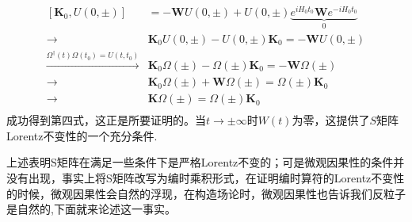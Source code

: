 \begin{equation}
    \begin{aligned}
        [\boldsymbol{K}_0,U(0,\pm)]&=-\boldsymbol{W}U(0,\pm)+U(0,\pm)\underbrace{e^{iH_0t_0}\boldsymbol{W}e^{-iH_0t_0}}_{0}\\
        \longrightarrow&\boldsymbol{K}_0U(0,\pm)-U(0,\pm)\boldsymbol{K}_0=-\boldsymbol{W}U(0,\pm)\\
        \overset{\Omega^\dagger(t)\Omega(t_0)=U(t,t_0)}{\longrightarrow}&\boldsymbol{K}_0\Omega(\pm)-\Omega(\pm)\boldsymbol{K}_0=-\boldsymbol{W}\Omega(\pm)\\
        \longrightarrow&\boldsymbol{K}_0\Omega(\pm)+\boldsymbol{W}\Omega(\pm)=\Omega(\pm)\boldsymbol{K}_0\\
        \longrightarrow&\boldsymbol{K}\Omega(\pm)=\Omega(\pm)\boldsymbol{K}_0\\
    \end{aligned}
\end{equation}
成功得到第四式，这正是所要证明的。当$t\rightarrow\pm\infty$时$W(t)$为零，这提供了$S$矩阵Lorentz不变性的一个充分条件.

\color{blue}上述表明S矩阵在满足一些条件下是严格Lorentz不变的；可是微观因果性的条件并没有出现，事实上将S矩阵改写为编时乘积形式，在证明编时算符的Lorentz不变性的时候，微观因果性会自然的浮现，在构造场论时，微观因果性也告诉我们反粒子是自然的\normalcolor,下面就来论述这一事实。

